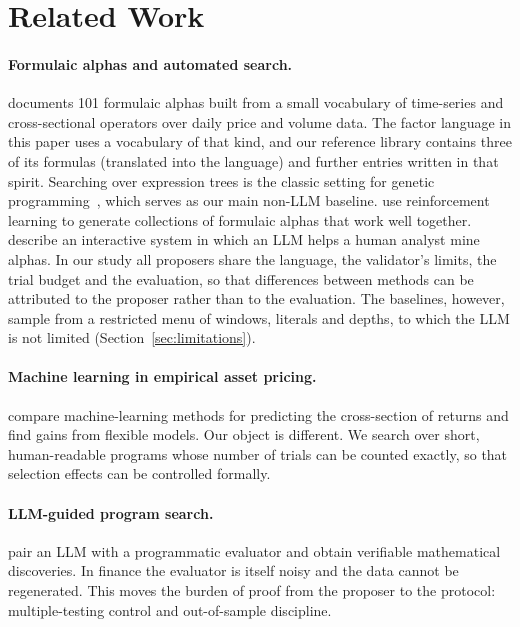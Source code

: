 \section{Related Work}
\label{sec:related}

\paragraph{Formulaic alphas and automated search.}
\citet{kakushadze2016alphas} documents 101 formulaic alphas built from a small
vocabulary of time-series and cross-sectional operators over daily price and
volume data. The factor language in this paper uses a vocabulary of that kind,
and our reference library contains three of its formulas (translated into
the language) and further entries written in that spirit. Searching
over expression trees is the classic setting for genetic
programming~\citep{koza1992genetic}, which serves as our main non-LLM
baseline. \citet{yu2023alphagen} use reinforcement learning to generate
collections of formulaic alphas that work well together. \citet{wang2023alphagpt}
describe an interactive system in which an LLM helps a human analyst mine
alphas. In our study all proposers share the language, the validator's
limits, the trial budget and the evaluation, so that differences between
methods can be attributed to the proposer rather than to the evaluation. The
baselines, however, sample from a restricted menu of windows, literals and
depths, to which the LLM is not limited (Section~\ref{sec:limitations}).

\paragraph{Machine learning in empirical asset pricing.}
\citet{gu2020empirical} compare machine-learning methods for predicting the
cross-section of returns and find gains from flexible models. Our object is
different. We search over short, human-readable programs whose number of
trials can be counted exactly, so that selection effects can be controlled
formally.

\paragraph{LLM-guided program search.}
\citet{romeraparedes2024funsearch} pair an LLM with a programmatic evaluator
and obtain verifiable mathematical discoveries. In finance the evaluator is
itself noisy and the data cannot be regenerated. This moves the burden of
proof from the proposer to the protocol: multiple-testing control and
out-of-sample discipline.

